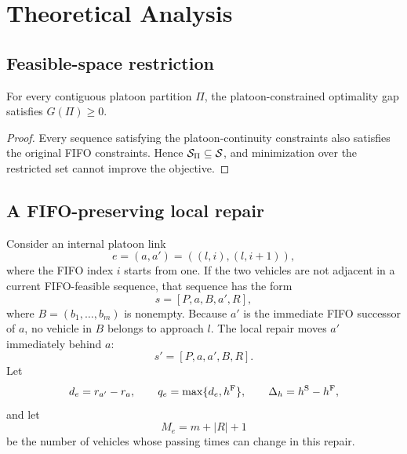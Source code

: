 \section{Theoretical Analysis}
\label{sec:theory}

\subsection{Feasible-space restriction}

\begin{proposition}
\hfill\break
For every contiguous platoon partition \(\Pi\), the platoon-constrained
optimality gap satisfies \(G(\Pi)\ge 0\).
\end{proposition}

\begin{proof}
Every sequence satisfying the platoon-continuity constraints also satisfies
the original FIFO constraints. Hence \(\mathcal{S}_{\Pi}\subseteq\mathcal{S}\), and
minimization over the restricted set cannot improve the objective.
\end{proof}

\subsection{A FIFO-preserving local repair}

Consider an internal platoon link
\begin{equation}
e=(a,a')=((l,i),(l,i+1)),
\end{equation}
where the FIFO index \(i\) starts from one. If the two vehicles are not
adjacent in a current FIFO-feasible sequence, that sequence has the form
\begin{equation}
s=[P,a,B,a',R],
\end{equation}
where \(B=(b_1,\ldots,b_m)\) is nonempty. Because \(a'\) is the immediate
FIFO successor of \(a\), no vehicle in \(B\) belongs to approach \(l\). The
local repair moves \(a'\) immediately behind \(a\):
\begin{equation}
s'=[P,a,a',B,R].
\label{eq:local-repair}
\end{equation}
Let
\begin{equation}
d_e=r_{a'}-r_a,
\qquad
q_e=\max\{d_e,h^{\mathrm{F}}\},
\qquad
\Delta_h=h^{\mathrm{S}}-h^{\mathrm{F}},
\end{equation}
and let
\begin{equation}
M_e=m+|R|+1
\end{equation}
be the number of vehicles whose passing times can change in this repair.

